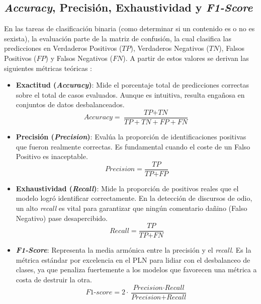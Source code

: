 \subsection{\textit{Accuracy}, Precisión, Exhaustividad y \textit{F1-Score}}
\label{subsec:AccPrcExhF1s}
En las tareas de clasificación binaria (como determinar si un contenido es o no es sexista), la evaluación parte de la matriz de confusión, la cual clasifica las predicciones en Verdaderos Positivos ($TP$), Verdaderos Negativos ($TN$), Falsos Positivos ($FP$) y Falsos Negativos ($FN$). A partir de estos valores se derivan las siguientes métricas teóricas \cite{sokolova2009systematic}: 
\begin{itemize}
    \item \textbf{Exactitud (\textit{Accuracy})}: Mide el porcentaje total de predicciones correctas sobre el total de casos evaluados. Aunque es intuitiva, resulta engañosa en conjuntos de datos desbalanceados. 
    \begin{equation}
        \textit{Accuracy} = \frac{\textit{TP} + \textit{TN}}{\textit{TP} + \textit{TN} + \textit{FP} + \textit{FN}}
        \label{eq:accuracy}
    \end{equation}
    \item \textbf{Precisión (\textit{Precision})}: Evalúa la proporción de identificaciones positivas que fueron realmente correctas. Es fundamental cuando el coste de un Falso Positivo es inaceptable.
    \begin{equation}
        \textit{Precision} = \frac{\textit{TP}}{\textit{TP} + \textit{FP}}
    \label{eq:precision}
    \end{equation}
    \item \textbf{Exhaustividad (\textit{Recall})}: Mide la proporción de positivos reales que el modelo logró identificar correctamente. En la detección de discursos de odio, un alto \textit{recall} es vital para garantizar que ningún comentario dañino (Falso Negativo) pase desapercibido. 
    \begin{equation}
        \textit{Recall} = \frac{\textit{TP}}{\textit{TP} + \textit{FN}}
    \label{eq:recall}
    \end{equation}
    \item \textbf{\textit{F1-Score}}: Representa la media armónica entre la precisión y el \textit{recall}. Es la métrica estándar por excelencia en el PLN para lidiar con el desbalanceo de clases, ya que penaliza fuertemente a los modelos que favorecen una métrica a costa de destruir la otra. 
    \begin{equation}
        \textit{F1-score} = 2 \cdot \frac{\textit{Precision} \cdot \textit{Recall}}{\textit{Precision} + \textit{Recall}}
        \label{eq:f1score}
    \end{equation}
\end{itemize}

